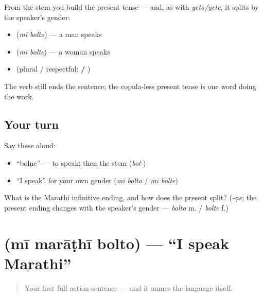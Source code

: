 \begin{grammarlens}[title={Grammar Lens: stem + gendered present ending}]
From the stem you build the present tense — and, as with \emph{yeto/yete}, it splits by the speaker's gender:

\begin{itemize}
\raggedright
  \item \textbf{ } (\emph{mī bolto}) — a man speaks
  \item \textbf{ } (\emph{mī bolte}) — a woman speaks
  \item (plural / respectful: \textbf{ / })
\end{itemize}

The verb still ends the sentence; the copula-less present tense is one word doing the work.
\end{grammarlens}

\subsection*{Your turn}
Say these aloud:

\begin{itemize}
\raggedright
  \item \textquotedblleft{}bolṇe\textquotedblright{} — to speak; then the stem (\emph{bol-})
  \item \textquotedblleft{}I speak\textquotedblright{} for your own gender (\emph{mī bolto} / \emph{mī bolte})
\end{itemize}

\begin{tcolorbox}[breakable,colback=teal!4,colframe=teal!35!black,title={Before you move on}]
What is the Marathi infinitive ending, and how does the present split? (\emph{-ṇe}; the present ending changes with the speaker's gender — \emph{bolto} m. / \emph{bolte} f.)
\end{tcolorbox}
\section[\texorpdfstring{\mr{मी} \mr{मराठी} \mr{बोलतो} (mī marāṭhī bolto)}{मी मराठी बोलतो (mī marāṭhī bolto)}]{   (mī marāṭhī bolto) — \textquotedblleft{}I speak Marathi\textquotedblright{}}

\label{lesson:MR-C05-mi-marathi-bolto}



\begin{quote}
Your first full action-sentence — and it names the language itself.
\end{quote}

